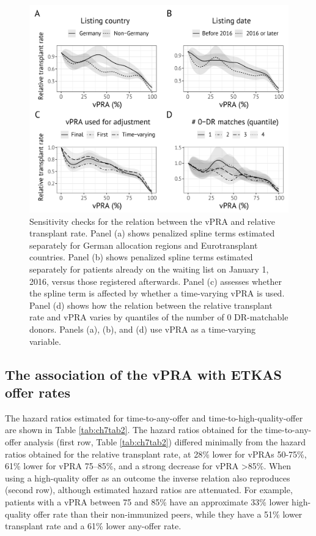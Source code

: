 \documentclass[11pt,twoside,]{book}
\begin{document}
\begin{figure}[ht]

{\centering \includegraphics[width=0.99\linewidth]{figures/ch7//figure3} 

}

\caption{Sensitivity checks for the relation between the vPRA and relative transplant rate. Panel (a) shows penalized spline terms estimated separately for German allocation regions and Eurotransplant countries. Panel (b) shows penalized spline terms estimated separately for patients already on the waiting list on January 1, 2016, versus those registered afterwards. Panel (c) assesses whether the spline term is affected by whether a time-varying vPRA is used. Panel (d) shows how the relation between the relative transplant rate and vPRA varies by quantiles of the number of 0 DR-matchable donors. Panels (a), (b), and (d) use vPRA as a time-varying variable.}\label{fig:ch7fig3}
\end{figure}

\vfill

\newpage

\subsection{The association of the vPRA with ETKAS offer rates}\label{the-association-of-the-vpra-with-etkas-offer-rates}

The hazard ratios estimated for time-to-any-offer and time-to-high-quality-offer are
shown in Table \ref{tab:ch7tab2}. The hazard ratios obtained for the time-to-any-offer
analysis (first
row, Table \ref{tab:ch7tab2}) differed minimally from the hazard ratios obtained for the
relative transplant rate, at 28\% lower for vPRAs 50-75\%, 61\% lower
for vPRA 75--85\%, and a strong decrease for vPRA \textgreater85\%. When using a high-quality
offer as an outcome the inverse relation also reproduces (second
row), although estimated hazard ratios are attenuated. For example,
patients with a vPRA between 75 and 85\% have an approximate 33\% lower high-quality
offer rate than their non-immunized peers, while they have a 51\% lower transplant
rate and a 61\% lower any-offer rate.
\end{document}
